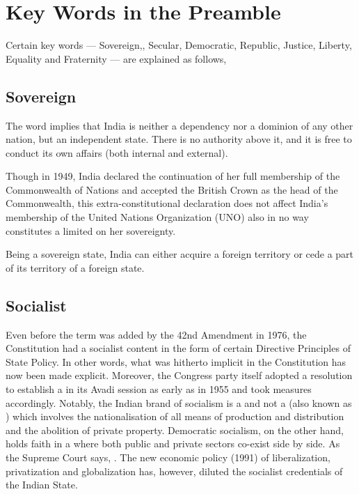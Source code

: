\section{Key Words in the Preamble}

Certain key words — Sovereign,, Secular, Democratic, Republic, Justice, Liberty, Equality and Fraternity — are explained as follows,

\subsection{Sovereign}

The word  implies that India is neither a dependency nor a dominion of any other nation, but an independent state. There is no authority above it, and it is free to conduct its own affairs (both internal and external).

Though in 1949, India declared the continuation of her full membership of the Commonwealth of Nations and accepted the British Crown as the head of the Commonwealth, this extra-constitutional declaration does not affect India's membership of the United Nations Organization (UNO) also in no way constitutes a limited on her sovereignty.

Being a sovereign state, India can either acquire a foreign territory or cede a part of its territory of a foreign state.

\subsection{Socialist}

Even before the term was added by the 42nd Amendment in 1976, the Constitution had a socialist content in the form of certain Directive Principles of State Policy. In other words, what was hitherto implicit in the Constitution has now been made explicit. Moreover, the Congress party itself adopted a resolution to establish a  in its Avadi session as early as in 1955 and took measures accordingly. Notably, the Indian brand of socialism is a  and not a  (also known as ) which involves the nationalisation of all means of production and distribution and the abolition of private property. Democratic socialism, on the other hand, holds faith in a  where both public and private sectors co-exist side by side. As the Supreme Court says, . The new economic policy (1991) of liberalization, privatization and globalization has, however, diluted the socialist credentials of the Indian State.


\theendnotes
\cleardoublepage

